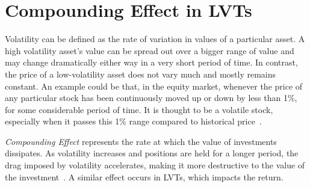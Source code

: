 \section{Compounding Effect in LVTs}\label{appx:voldrag}
Volatility can be defined as the rate of variation in values of a particular asset. A high volatility asset's value can be spread out over a bigger range of value and may change dramatically either way in a very short period of time. In contrast, the price of a low-volatility asset does not vary much and mostly remains constant. An example could be that, in the equity market, whenever the price of any particular stock has been continuously moved up or down by less than 1\%, for some considerable period of time. It is thought to be a volatile stock, especially when it passes this 1\% range compared to historical price~\cite{Investo_Volatility}.

\textsl{Compounding Effect} represents the rate at which the value of investments dissipates. As volatility increases and positions are held for a longer period, the drag imposed by volatility accelerates, making it more destructive to the  value of the investment~\cite{tsalikis2019can,SeekingAlpha_Volatility}. A similar effect occurs in LVTs, which impacts the return.


